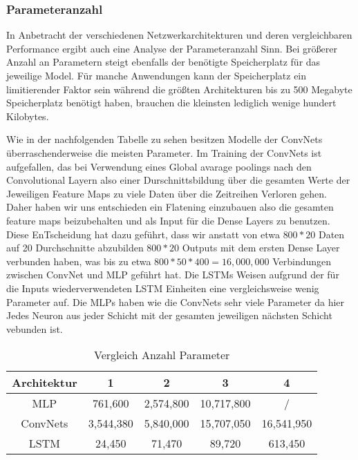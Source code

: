 \documentclass[acmtog, authorversion]{acmart} %
\begin{document}
\subsubsection{Parameteranzahl}

In Anbetracht der verschiedenen Netzwerkarchitekturen und deren vergleichbaren Performance ergibt auch eine Analyse der Parameteranzahl Sinn. Bei größerer Anzahl an Parametern steigt ebenfalls der benötigte Speicherplatz für das jeweilige Model. Für manche Anwendungen kann der Speicherplatz ein limitierender Faktor sein während die größten Architekturen bis zu 500 Megabyte Speicherplatz benötigt haben, brauchen die kleinsten lediglich wenige hundert Kilobytes. 

Wie in der nachfolgenden Tabelle zu sehen besitzen Modelle der ConvNets überraschenderweise die meisten Parameter. Im Training der ConvNets ist aufgefallen, das bei Verwendung eines Global avarage poolings nach den Convolutional Layern also einer Durschnittsbildung über die gesamten Werte der Jeweiligen Feature Maps zu viele Daten über die Zeitreihen Verloren gehen. Daher haben wir uns entschieden ein Flatening einzubauen also die gesamten feature maps beizubehalten und als Input für die Dense Layers zu benutzen. Diese EnTscheidung hat dazu geführt, dass wir anstatt von etwa $800*20$ Daten auf 20 Durchschnitte abzubilden $800*20$ Outputs mit dem ersten Dense Layer verbunden haben, was bis zu etwa $800*50*400 = 16,000,000$ Verbindungen zwischen ConvNet und MLP geführt hat. 
Die LSTMs Weisen aufgrund der für die Inputs wiederverwendeten LSTM Einheiten eine vergleichsweise wenig Parameter auf. Die MLPs haben wie die ConvNets sehr viele Parameter da hier Jedes Neuron aus jeder Schicht mit der gesamten jeweiligen nächsten Schicht vebunden ist.
\begin{table}[htp]
    \centering
    \begin{tabular}{|c|c|c|c|c|}
    \hline
         Architektur & 1 & 2 & 3 & 4  \\
    \hline
         MLP & 761,600 &  2,574,800 & 10,717,800 & / \\
    \hline
          ConvNets& 3,544,380 &  5,840,000 & 15,707,050 & 16,541,950\\
    \hline
        LSTM & 24,450 &  71,470 & 89,720 & 613,450 \\
    \hline
    \end{tabular}
    \caption{Vergleich Anzahl Parameter}
    \label{tab:my_label}
\end{table}
\end{document}
